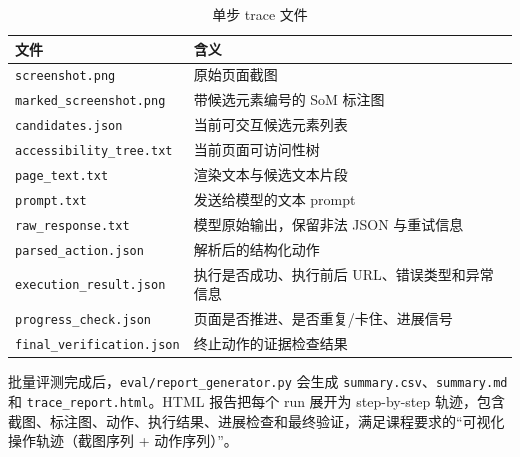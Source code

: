 \begin{table}[H]
  \centering
  \caption{单步 trace 文件}
  \label{tab:trace-files}
  \small
  \begin{tabularx}{\textwidth}{p{}Y}
    \toprule
    文件 & 含义 \\
    \midrule
    \texttt{screenshot.png} & 原始页面截图 \\
    \texttt{marked\_screenshot.png} & 带候选元素编号的 SoM 标注图 \\
    \texttt{candidates.json} & 当前可交互候选元素列表 \\
    \texttt{accessibility\_tree.txt} & 当前页面可访问性树 \\
    \texttt{page\_text.txt} & 渲染文本与候选文本片段 \\
    \texttt{prompt.txt} & 发送给模型的文本 prompt \\
    \texttt{raw\_response.txt} & 模型原始输出，保留非法 JSON 与重试信息 \\
    \texttt{parsed\_action.json} & 解析后的结构化动作 \\
    \texttt{execution\_result.json} & 执行是否成功、执行前后 URL、错误类型和异常信息 \\
    \texttt{progress\_check.json} & 页面是否推进、是否重复/卡住、进展信号 \\
    \texttt{final\_verification.json} & 终止动作的证据检查结果 \\
    \bottomrule
  \end{tabularx}
\end{table}

批量评测完成后，\texttt{eval/report\_generator.py} 会生成 \texttt{summary.csv}、\texttt{summary.md} 和 \texttt{trace\_report.html}。HTML 报告把每个 run 展开为 step-by-step 轨迹，包含截图、标注图、动作、执行结果、进展检查和最终验证，满足课程要求的“可视化操作轨迹（截图序列 + 动作序列）”。
